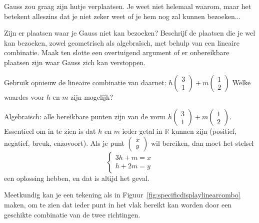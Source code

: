 \documentclass{ximera}
\begin{document}
\begin{exercise}
Gauss zou graag zijn hutje verplaatsen.
Je weet niet helemaal waarom, maar het betekent alleszins dat je niet zeker weet of je hem nog zal kunnen bezoeken...\newline

Zijn er plaatsen waar je Gauss niet kan bezoeken?
Beschrijf de plaatsen die je wel kan bezoeken, zowel geometrisch als algebraïsch, met behulp van een lineaire combinatie.
Maak ten slotte een overtuigend argument of er onbereikbare plaatsen zijn waar Gauss zich kan verstoppen.
\begin{hint}
    Gebruik opnieuw de lineaire combinatie van daarnet: \(h \begin{pmatrix} 3 \\ 1 \end{pmatrix} + m \begin{pmatrix} 1 \\ 2 \end{pmatrix}\)
    Welke waardes voor \(h\) en \(m\) zijn mogelijk?
\end{hint}
\begin{oplossing}
    Algebraïsch: alle bereikbare punten zijn van de vorm \(h \begin{pmatrix} 3 \\ 1 \end{pmatrix} + m \begin{pmatrix} 1 \\ 2 \end{pmatrix}\).
    Essentieel om in te zien is dat \(h\) en \(m\) ieder getal in \(\mathbb{R}\) kunnen zijn (positief, negatief, breuk, enzovoort).
    Als je punt \(\begin{pmatrix} x \\ y \end{pmatrix}\) wil bereiken, dan moet het stelsel
    \[
    \left\{
        \begin{array}{l}
        3h+m=x\\
        h+2m=y
        \end{array}
    \right.
    \]
    een oplossing hebben, en dat is altijd het geval.\newline

    Meetkundig kan je een tekening als in Figuur~\ref{fig:specificdisplaylinearcombo} maken, om te zien dat ieder punt in het vlak bereikt kan worden door een geschikte combinatie van de twee richtingen.
\begin{image}
    \begin{tikzpicture}[scale=0.7]


\end{tikzpicture}
\end{image}
\end{oplossing}
\end{exercise}
\end{document}

